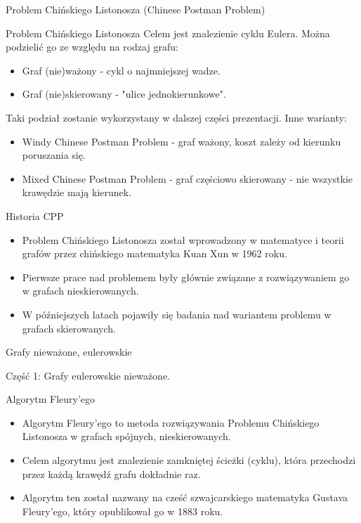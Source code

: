 \documentclass[polish,envcountsect,10pt]{beamer}
\begin{document}
\begin{frame}{Problem Chińskiego Listonosza (Chinese Postman Problem)}
    \begin{block}{Problem Chińskiego Listonosza}
        Celem jest znalezienie cyklu Eulera.
        Można podzielić go ze względu na rodzaj grafu:
        \begin{itemize}
            \item Graf (nie)ważony - cykl o najmniejszej wadze.
            \item Graf (nie)skierowany - "ulice jednokierunkowe".
        \end{itemize}
        Taki podział zostanie wykorzystany w dalszej części prezentacji.
        Inne warianty:
        \begin{itemize}
            \item Windy Chinese Postman Problem - graf ważony, koszt zależy od kierunku poruszania się.
            \item Mixed Chinese Postman Problem - graf częściowo skierowany - nie wszystkie krawędzie mają kierunek.
        \end{itemize}
    \end{block}
\end{frame}

\begin{frame}{Historia CPP}
    \begin{itemize}
        \item Problem Chińskiego Listonosza został wprowadzony w matematyce i teorii grafów przez chińskiego matematyka Kuan Xun w 1962 roku.
        \item Pierwsze prace nad problemem były głównie związane z rozwiązywaniem go w grafach nieskierowanych.
        \item W późniejszych latach pojawiły się badania nad wariantem problemu w grafach skierowanych.
    \end{itemize}
\end{frame}

\begin{frame}{Grafy nieważone, eulerowskie}
    \begin{block}{}
        \begin{center}
            Część 1: Grafy eulerowskie nieważone.
        \end{center}
    \end{block}
\end{frame}

\begin{frame}{Algorytm Fleury'ego}
    \begin{itemize}
      \item Algorytm Fleury'ego to metoda rozwiązywania Problemu Chińskiego Listonosza w grafach spójnych, nieskierowanych.
      \item Celem algorytmu jest znalezienie zamkniętej ścieżki (cyklu), która przechodzi przez każdą krawędź grafu dokładnie raz.
      \item Algorytm ten został nazwany na cześć szwajcarskiego matematyka Gustava Fleury'ego, który opublikował go w 1883 roku.
    \end{itemize}
\end{frame}
\end{document}
